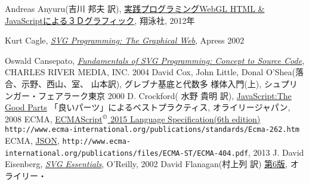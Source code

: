 \begin{thebibliography}{99}
Andreas Anyuru(吉川 邦夫 訳),
\href{http://www.amazon.co.jp/%E5%AE%9F%E8%B7%B5%E3%83%97%E3%83%AD%E3%82%B0%E3%83%A9%E3%83%9F%E3%83%B3%E3%82%B0WebGL-HTML-JavaScript%E3%81%AB%E3%82%88%E3%82%8B3D%E3%82%B0%E3%83%A9%E3%83%95%E3%82%A3%E3%83%83%E3%82%AF%E3%82%B9%E9%96%8B%E7%99%BA-Programmer%E2%80%99s-SELECTION/dp/4798129534/ref=sr_1_1?ie=UTF8&qid=1365330500&sr=8-1&keywords=%E5%AE%9F%E8%B7%B5%E3%83%97%E3%83%AD%E3%82%B0%E3%83%A9%E3%83%9F%E3%83%B3%E3%82%B0WebGL}
{実践プログラミングWebGL HTML \& JavaScriptによる３Ｄグラフィック},
翔泳社, 2012年
\iffalse\else
{} Kurt Cagle, 
   \href{http://www.amazon.co.jp/exec/obidos/ASIN/1590590198/qid=1144561984/sr=1-4/ref=sr_1_10_4/249-1775097-0214759}
     {\it SVG Programming: The Graphical Web}, Apress 2002
\fi
  Oswald Cansepato, 
	\href{http://www.amazon.co.jp/exec/obidos/ASIN/1584502983/qid=1144561984/sr=1-1/ref=sr_1_10_1/249-1775097-0214759}
     {\it Fundamentals of SVG Programming: Concept to
	Source Code}, 
     CHARLES RIVER MEDIA, INC. 2004
 David Cox, John Little, Donal O'Shea(落合、示野、西山、室、
	山本訳), グレブナ基底と代数多
	様体入門(上), シュプリンガー・フェアラーク東京 2000
 D. Crockford( 水野 貴明 訳),
	 \href{http://www.amazon.co.jp/JavaScript%253a-Parts-%E2%80%95%E3%80%8C%E8%89%AF%E3%81%84%E3%83%91%E3%83%BC%E3%83%84%E3%80%8D%E3%81%AB%E3%82%88%E3%82%8B%E3%83%99%E3%82%B9%E3%83%88%E3%83%97%E3%83%A9%E3%82%AF%E3%83%86%E3%82%A3%E3%82%B9-Douglas-Crockford/dp/4873113911/ref=sr_1_1?ie=UTF8&qid=1304649181&sr=8-1}{JavaScript:The Good Parts}
         「良いパーツ」によるベストプラクティス, オライリージャパン, 2008
 ECMA, 
\href{http://www.ecma-international.org/publications/standards/Ecma-262.htm}
{ECMAScript$^\copyright$ 2015 Language Specification(6th edition)}\newline
\texttt{http://www.ecma-international.org/publications/standards/Ecma-262.htm}
ECMA,
\href{http://www.ecma-international.org/publications/files/ECMA-ST/ECMA-404.pdf}
				{JSON},
\texttt{http://www.ecma-international.org/publications/files/ECMA-ST/ECMA-404.pdf}, 2013
 J. David Eisenberg,
\href{http://www.amazon.co.jp/gp/product/0596002238/250-4160686-1026605?v=glance&n=1000}{\it
	 SVG Essentials}, O'Reilly, 2002
 David Flanagan(村上列 訳) 
\href{http://www.amazon.co.jp/JavaScript-第6版-David-Flanagan/dp/4873115736/ref=sr_1_1?ie=UTF8&qid=1353802698&sr=8-1}{\JS{} 第6版}, オライリー・

\end{thebibliography}
